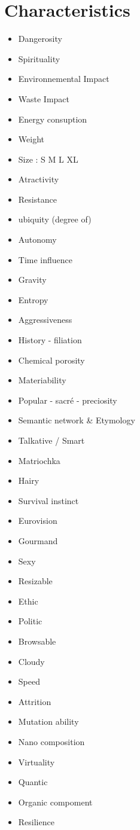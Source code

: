 \section{Characteristics}
\begin{itemize}
\item Dangerosity
\item Spirituality
\item Environnemental Impact
\item Waste Impact
\item Energy consuption
\item Weight
\item Size : S M L XL
\item Atractivity
\item Resistance
\item ubiquity (degree of)
\item Autonomy
\item Time influence
\item Gravity
\item Entropy
\item Aggressiveness
\item History - filiation
\item Chemical porosity
\item Materiability
\item Popular - sacr\'e - preciosity
\item Semantic network \& Etymology
\item Talkative / Smart
\item Matriochka~
\item Hairy
\item Survival instinct
\item Eurovision
\item Gourmand
\item Sexy
\item Resizable
\item Ethic
\item Politic
\item Browsable
\item Cloudy
\item Speed
\item Attrition
\item Mutation ability
\item Nano composition
\item Virtuality
\item Quantic~
\item Organic compoment
\item Resilience

\end{itemize}
